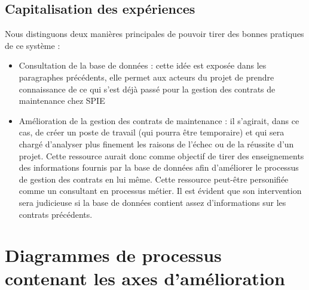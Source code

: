 \subsection{Capitalisation des expériences}
Nous distinguons deux manières principales de pouvoir tirer des bonnes pratiques de ce système :
\begin{itemize}
\item Consultation de la base de données : cette idée est exposée dans les paragraphes précédents, elle permet aux acteurs du projet de prendre connaissance de ce qui s'est déjà passé pour la gestion des contrats de maintenance chez SPIE
\item Amélioration de la gestion des contrats de maintenance : il s'agirait, dans ce cas, de créer un poste de travail (qui pourra être temporaire) et qui sera chargé d'analyser plus finement les raisons de l'échec ou de la réussite d'un projet. Cette ressource aurait donc comme objectif de tirer des enseignements des informations fournis par la base de données afin d'améliorer le processus de gestion des contrats en lui même. Cette ressource peut-être personifiée comme un consultant en processus métier. Il est évident que son intervention sera judicieuse si la base de données contient assez d'informations sur les contrats précédents.
\end{itemize}



\section{Diagrammes de processus contenant les axes d'amélioration}





